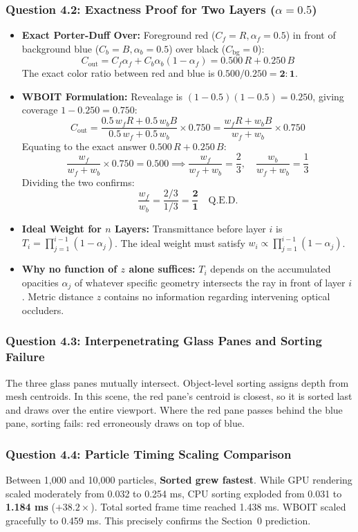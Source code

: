 \documentclass[10pt,a4paper]{article}
\begin{document}
\subsubsection*{Question 4.2: Exactness Proof for Two Layers ($\alpha = 0.5$)}
\begin{itemize}
    \item \textbf{Exact Porter-Duff Over:} Foreground red ($C_f = R, \alpha_f = 0.5$) in front of background blue ($C_b = B, \alpha_b = 0.5$) over black ($C_{\text{bg}} = 0$):
    \[
    C_{\text{out}} = C_f \alpha_f + C_b \alpha_b (1 - \alpha_f) = 0.500\,R + 0.250\,B
    \]
    The exact color ratio between red and blue is $0.500 / 0.250 = \mathbf{2 : 1}$.
    \item \textbf{WBOIT Formulation:} Revealage is $(1 - 0.5)(1 - 0.5) = 0.250$, giving coverage $1 - 0.250 = 0.750$:
    \[
    C_{\text{out}} = \frac{0.5\,w_f R + 0.5\,w_b B}{0.5\,w_f + 0.5\,w_b} \times 0.750 = \frac{w_f R + w_b B}{w_f + w_b} \times 0.750
    \]
    Equating to the exact answer $0.500\,R + 0.250\,B$:
    \[
    \frac{w_f}{w_f + w_b} \times 0.750 = 0.500 \implies \frac{w_f}{w_f + w_b} = \frac{2}{3}, \quad \frac{w_b}{w_f + w_b} = \frac{1}{3}
    \]
    Dividing the two confirms:
    \[
    \frac{w_f}{w_b} = \frac{2/3}{1/3} = \frac{\mathbf{2}}{\mathbf{1}} \quad \text{Q.E.D.}
    \]
    \item \textbf{Ideal Weight for $n$ Layers:} Transmittance before layer $i$ is $T_i = \prod_{j=1}^{i-1} (1 - \alpha_j)$. The ideal weight must satisfy $w_i \propto \prod_{j=1}^{i-1} (1 - \alpha_j)$.
    \item \textbf{Why no function of $z$ alone suffices:} $T_i$ depends on the accumulated opacities $\alpha_j$ of whatever specific geometry intersects the ray in front of layer $i$. Metric distance $z$ contains no information regarding intervening optical occluders.
\end{itemize}

\subsubsection*{Question 4.3: Interpenetrating Glass Panes and Sorting Failure}
The three glass panes mutually intersect. Object-level sorting assigns depth from mesh centroids. In this scene, the red pane's centroid is closest, so it is sorted last and draws over the entire viewport. Where the red pane passes behind the blue pane, sorting fails: red erroneously draws on top of blue.

\subsubsection*{Question 4.4: Particle Timing Scaling Comparison}
Between 1,000 and 10,000 particles, \textbf{Sorted grew fastest}. While GPU rendering scaled moderately from 0.032 to 0.254 ms, CPU sorting exploded from 0.031 to \textbf{1.184 ms} ($+38.2\times$). Total sorted frame time reached 1.438 ms. WBOIT scaled gracefully to 0.459 ms. This precisely confirms the Section~0 prediction.
\end{document}
